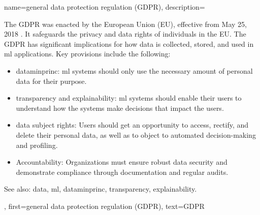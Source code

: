 {name={general data protection regulation (GDPR)},
	description={The GDPR
			was enacted by the European Union (EU), effective from May 25, 2018 \cite{GDPR2016}. 
			It safeguards the privacy and \gls{data} rights of individuals in the EU. 
			The GDPR has significant implications for how \gls{data} is collected, stored, and used in \gls{ml}  
			applications. Key provisions include the following:
			\begin{itemize}
				\item \Gls{dataminprinc}: \gls{ml} systems should only use the necessary amount of personal 
				\gls{data} for their purpose.
				\item \Gls{transparency} and \gls{explainability}: \gls{ml} systems should enable their users to 
				understand how the systems make decisions that impact the users.
				\item \Gls{data} subject rights: Users should get an opportunity to access, rectify, and delete their personal \gls{data}, as well as to object to automated decision-making and profiling.
				\item Accountability: Organizations must ensure robust \gls{data} security and demonstrate 
				compliance through documentation and regular audits.
			\end{itemize}
		See also: \gls{data}, \gls{ml}, \gls{dataminprinc}, \gls{transparency}, \gls{explainability}.}, 
	first={general data protection regulation (GDPR)},
	text={GDPR}
}
	
